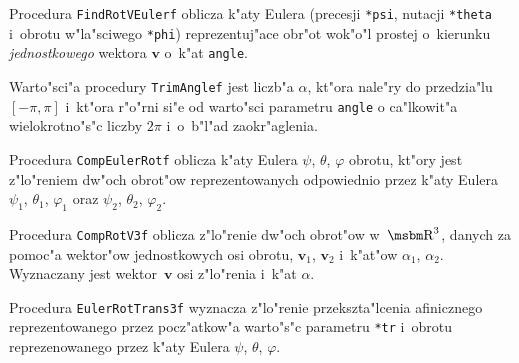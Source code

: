 \vspace{\bigskipamount}
Procedura \texttt{FindRotVEulerf} oblicza k"aty Eulera (precesji
\texttt{*psi}, nutacji \texttt{*theta} i~obrotu w"la"sciwego \texttt{*phi})
reprezentuj"ace obr"ot wok"o"l prostej o~kierunku \emph{jednostkowego}
wektora $\bm{v}$ o~k"at \texttt{angle}.

\vspace{\bigskipamount}
\begin{sloppypar}
Warto"sci"a procedury \texttt{TrimAnglef} jest liczb"a $\alpha$, kt"ora
nale"ry do przedzia"lu $[-\pi,\pi]$ i~kt"ora r"o"rni si"e od warto"sci
parametru \texttt{angle} o ca"lkowit"a wielokrotno"s"c liczby $2\pi$
i~o~b"l"ad zaokr"aglenia.
\end{sloppypar}

\vspace{\bigskipamount}
Procedura \texttt{CompEulerRotf} oblicza k"aty Eulera $\psi$, $\theta$,
$\varphi$ obrotu, kt"ory jest z"lo"reniem dw"och obrot"ow reprezentowanych
odpowiednio przez k"aty Eulera $\psi_1$, $\theta_1$, $\varphi_1$ oraz
$\psi_2$, $\theta_2$, $\varphi_2$.

\vspace{\bigskipamount}
Procedura \texttt{CompRotV3f} oblicza z"lo"renie dw"och obrot"ow w~$\R^3$,
danych za pomoc"a wektor"ow jednostkowych osi obrotu, $\bm{v}_1$, $\bm{v}_2$
i~k"at"ow $\alpha_1$, $\alpha_2$. Wyznaczany jest wektor~$\bm{v}$ osi
z"lo"renia i~k"at $\alpha$.

\vspace{\bigskipamount}
Procedura \texttt{EulerRotTrans3f} wyznacza z"lo"renie przekszta"lcenia
afinicznego reprezentowanego przez pocz"atkow"a warto"s"c parametru
\texttt{*tr} i~obrotu reprezenowanego przez k"aty Eulera $\psi$, $\theta$,
$\varphi$.


